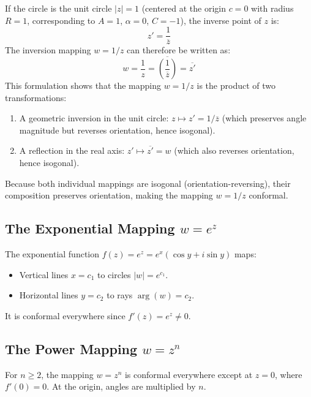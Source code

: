 \documentclass[12pt,a4paper]{article}
\begin{document}
If the circle is the unit circle $|z| = 1$ (centered at the origin $c = 0$ with radius $R = 1$, corresponding to $A=1$, $\alpha=0$, $C=-1$), the inverse point of $z$ is:
\begin{equation}
    z' = \frac{1}{\overline{z}}
\end{equation}
The inversion mapping $w = 1/z$ can therefore be written as:
\begin{equation}
    w = \frac{1}{z} = \overline{\left( \frac{1}{\overline{z}} \right)} = \overline{z'}
\end{equation}
This formulation shows that the mapping $w = 1/z$ is the product of two transformations:
\begin{enumerate}
    \item A geometric inversion in the unit circle: $z \mapsto z' = 1/\overline{z}$ (which preserves angle magnitude but reverses orientation, hence isogonal).
    \item A reflection in the real axis: $z' \mapsto \overline{z'} = w$ (which also reverses orientation, hence isogonal).
\end{enumerate}
Because both individual mappings are isogonal (orientation-reversing), their composition preserves orientation, making the mapping $w = 1/z$ conformal.

\subsection{The Exponential Mapping \texorpdfstring{$w = e^z$}{w = e\textasciicircum z}}
The exponential function $f(z) = e^z = e^{x}(\cos y + i\sin y)$ maps:
\begin{itemize}
    \item Vertical lines $x = c_1$ to circles $|w| = e^{c_1}$.
    \item Horizontal lines $y = c_2$ to rays $\arg(w) = c_2$.
\end{itemize}
It is conformal everywhere since $f'(z) = e^z \neq 0$.

\subsection{The Power Mapping \texorpdfstring{$w = z^n$}{w = z\textasciicircum n}}
For $n \ge 2$, the mapping $w = z^n$ is conformal everywhere except at $z = 0$, where $f'(0) = 0$. At the origin, angles are multiplied by $n$.
\end{document}
